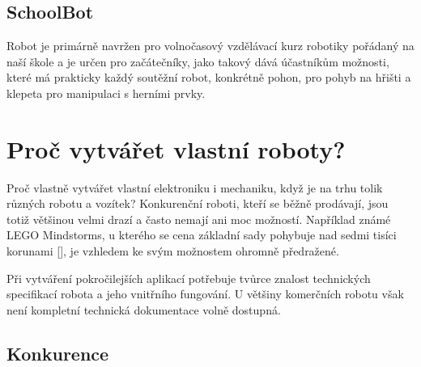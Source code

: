 \documentclass{template/socthesis}
\begin{document}
\section{SchoolBot}
Robot je primárně navržen pro volnočasový vzdělávací kurz robotiky pořádaný na naší škole a je určen pro začátečníky, jako takový dává účastníkům možnosti, které má prakticky každý soutěžní robot, konkrétně pohon, pro pohyb na hřišti a klepeta pro manipulaci s herními prvky.



\newpage

\chapter{Proč vytvářet vlastní roboty?}
Proč vlastně vytvářet vlastní elektroniku i mechaniku, když je na trhu tolik různých robotu a vozítek? Konkurenční roboti, kteří se běžně prodávají, jsou totiž většinou velmi drazí a často nemají ani moc možností. Například známé LEGO Mindstorms, u kterého se cena základní sady pohybuje nad sedmi tisíci korunami [], je vzhledem ke svým možnostem ohromně předražené.
 
Při vytváření pokročilejších aplikací potřebuje tvůrce znalost technických specifikací robota a jeho vnitřního fungování. U většiny komerčních robotu však není kompletní technická dokumentace volně dostupná.

\section{Konkurence}
\end{document}

